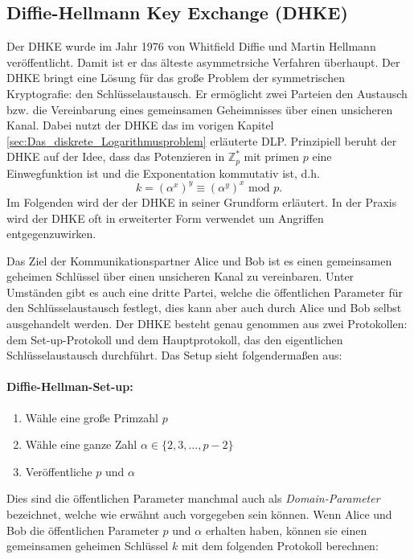 \subsection{Diffie-Hellmann Key Exchange (DHKE)} \label{sec:DHKE}
Der DHKE wurde im Jahr 1976 von Whitfield Diffie und Martin Hellmann veröffentlicht. Damit ist er das älteste asymmetrsiche Verfahren überhaupt. Der DHKE bringt eine Lösung für das große Problem der symmetrischen Kryptografie: den Schlüsselaustausch. Er ermöglicht zwei Parteien den Austausch bzw. die Vereinbarung eines gemeinsamen Geheimnisses über einen unsicheren Kanal. Dabei nutzt der DHKE das im vorigen Kapitel \ref{sec:Das_diskrete_Logarithmusproblem} erläuterte DLP.  Prinzipiell beruht der DHKE auf der Idee, dass das Potenzieren in $\mathbb{Z}^*_p$ mit primen $p$ eine Einwegfunktion ist und die Exponentation kommutativ ist, d.h. $$k = (\alpha ^x)^y \equiv (\alpha ^y)^x \text{ mod } p.$$
Im Folgenden wird der der DHKE in seiner Grundform erläutert. In der Praxis wird der DHKE oft in erweiterter Form verwendet um Angriffen entgegenzuwirken.

Das Ziel der Kommunikationspartner Alice und Bob ist es einen gemeinsamen geheimen Schlüssel über einen unsicheren Kanal zu vereinbaren. Unter Umständen gibt es auch eine dritte Partei, welche die öffentlichen Parameter für den Schlüsselaustausch festlegt, dies kann aber auch durch Alice und Bob selbst ausgehandelt werden. Der DHKE besteht genau genommen aus zwei Protokollen: dem Set-up-Protokoll und dem Hauptprotokoll, das den eigentlichen Schlüsselaustausch durchführt. Das Setup sieht folgendermaßen aus:
\paragraph{Diffie-Hellman-Set-up:}
\begin{enumerate}
\item Wähle eine große Primzahl $p$
\item Wähle eine ganze Zahl $\alpha \in \{2,3,..., p-2\}$
\item Veröffentliche $p$ und $\alpha$
\end{enumerate}

Dies sind die öffentlichen Parameter manchmal auch als \textit{Domain-Parameter} bezeichnet, welche wie erwähnt auch vorgegeben sein können. Wenn Alice und Bob die öffentlichen Parameter $p$ und $\alpha$ erhalten haben, können sie einen gemeinsamen geheimen Schlüssel $k$ mit dem folgenden Protokoll berechnen:

